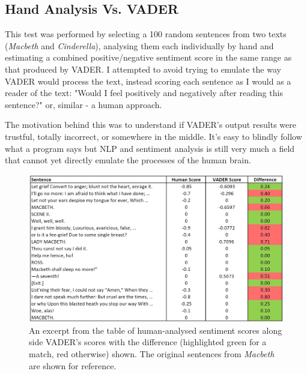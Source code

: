 \documentclass{article}
\begin{document}
{    \subsection{Hand Analysis Vs. VADER}
    \label{subsec:handAnalysis}
        This test was performed by selecting a 100 random sentences from two texts (\textit{Macbeth} and \textit{Cinderella}), analysing them each individually by hand and estimating a combined positive/negative sentiment score in the same range as that produced by VADER. I attempted to avoid trying to emulate the way VADER would process the text, instead scoring each sentence as I would as a reader of the text: "Would I feel positively and negatively after reading this sentence?" or, similar - a human approach.
        
        The motivation behind this was to understand if VADER's output results were trustful, totally incorrect, or somewhere in the middle. It's easy to blindly follow what a program says but NLP and sentiment analysis is still very much a field that cannot yet directly emulate the processes of the human brain.
    
        \begin{figure}[hbtp]
            \includegraphics[width=1\textwidth]{Figures/HandAnalysis/Macbeth}
            \centering
            \caption{An excerpt from the table of human-analysed sentiment scores along side VADER's scores with the difference (highlighted green for a match, red otherwise) shown. The original sentences from \textit{Macbeth} are shown for reference.}
            \label{fig:handMacbeth}
        \end{figure}
        
}
\end{document}

